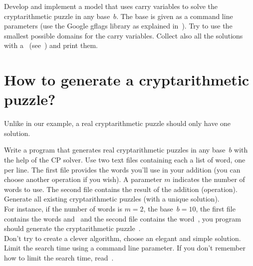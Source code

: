 \documentclass[]{article}
\begin{document}
\begin{exercise}[\difficultyOne]
 Develop and implement a model that uses carry variables to solve the cryptarithmetic puzzle  in any base~$b$. The base is given as a command line parameters (use the Google gflags library as explained in~). Try to use the smallest possible domains for the carry variables. Collect also all the solutions with a~ (see~) and print them.
\end{exercise}
\vspace{-1cm}
\section{How to generate a cryptarithmetic puzzle?}\label{how_to_generate_crytarithmetic_puzzle}

Unlike in our example, a real cryptarithmetic puzzle should only have one solution.\\

\begin{exercise}[\difficultyTwo]
Write a program that generates real cryptarithmetic puzzles in any base~$b$ with the help of the CP solver. Use two text files containing each a list of word, one per line. The first file provides the words you'll use in your addition  (you can choose another operation if you wish). A parameter $m$ indicates the number of words to use. The second file contains the result of the addition (operation). Generate all existing cryptarithmetic puzzles (with a unique solution).\\

For instance, if the number of words is $m = 2$, the base~$b = 10$, the first file contains the words  and~ and the second file contains the word~, you program should generate
the cryptarithmetic puzzle~.\\

Don't try to create a clever algorithm, choose an elegant and simple solution. Limit the search time using a command line parameter. If you don't remember how to limit the search time, read~.
\end{exercise}
\end{document}
